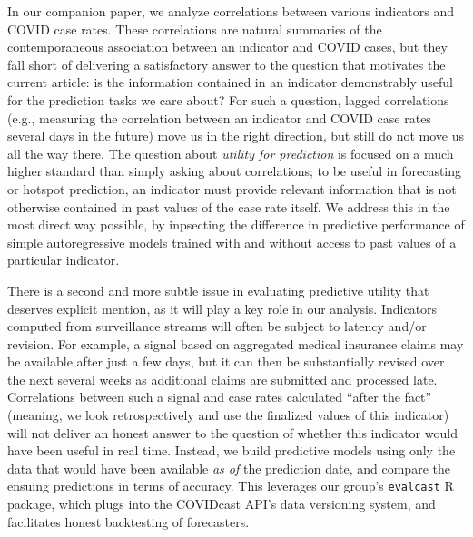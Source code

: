 \documentclass[9pt,twocolumn,twoside,lineno]{pnas-new}
\begin{document}
In our companion paper, we analyze correlations between various indicators and   
COVID case rates. These correlations are natural summaries of the
contemporaneous association between an indicator and COVID cases, but they fall
short of delivering a satisfactory answer to the question that motivates the
current article: is the information contained in an indicator demonstrably
useful for the prediction tasks we care about? For such a question, lagged
correlations (e.g., measuring the correlation between an indicator and COVID
case rates several days in the future) move us in the right direction, but still
do not move us all the way there. The question about \emph{utility for
  prediction} is focused on a much higher standard than simply asking 
about correlations; to be useful in forecasting or hotspot prediction, an 
indicator must provide relevant information that is not otherwise contained in 
past values of the case rate itself. We address this in the most direct way
possible, by inpsecting the difference in predictive performance of simple 
autoregressive models trained with and without access to past values of a 
particular indicator.  

There is a second and more subtle issue in evaluating predictive utility that
deserves explicit mention, as it will play a key role in our
analysis. Indicators computed from surveillance streams will often be subject to
latency and/or revision. For example, a signal based on aggregated medical
insurance claims may be available after just a few days, but it can then be
substantially revised over the next several weeks as additional claims are
submitted and processed late. Correlations between such a signal and case rates 
calculated ``after the fact'' (meaning, we look retrospectively and use the
finalized values of this indicator) will not deliver an honest answer to the
question of whether this indicator would have been useful in real time. Instead, 
we build predictive models using only the data that would have been available 
\emph{as of} the prediction date, and compare the ensuing predictions in terms
of accuracy. This leverages our group's {\tt evalcast} R package, which plugs
into the COVIDcast API's data versioning system, and facilitates honest
backtesting of forecasters.   
\end{document}
